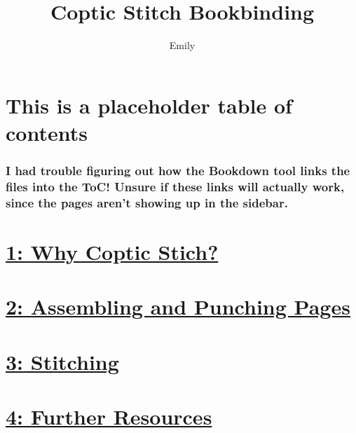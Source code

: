 \documentclass[
  openany]{book}
\title{Coptic Stitch Bookbinding}
\author{Emily}
\date{}
\begin{document}
\maketitle

{
\setcounter{tocdepth}{1}
\tableofcontents
}
\chapter{This is a placeholder table of contents}\label{this-is-a-placeholder-table-of-contents}

\subsection{I had trouble figuring out how the Bookdown tool links the files into the ToC! Unsure if these links will actually work, since the pages aren't showing up in the sidebar.}\label{i-had-trouble-figuring-out-how-the-bookdown-tool-links-the-files-into-the-toc-unsure-if-these-links-will-actually-work-since-the-pages-arent-showing-up-in-the-sidebar.}

\chapter{\texorpdfstring{\href{01-why-coptic.md}{1: Why Coptic Stich?}}{1: Why Coptic Stich?}}\label{why-coptic-stich}

\chapter{\texorpdfstring{\href{02-assemble-pages.md}{2: Assembling and Punching Pages}}{2: Assembling and Punching Pages}}\label{assembling-and-punching-pages}

\chapter{\texorpdfstring{\href{03-stitching.md}{3: Stitching}}{3: Stitching}}\label{stitching}

\chapter{\texorpdfstring{\href{04-resources.md}{4: Further Resources}}{4: Further Resources}}\label{further-resources}
\end{document}
